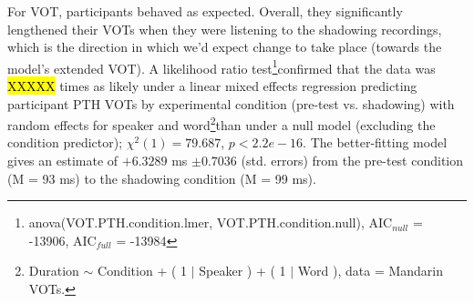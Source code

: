 For VOT, participants behaved as expected. Overall, they significantly lengthened their VOTs when they were listening to the shadowing recordings, %
which is the direction in which we'd expect change to take place (towards the model's extended VOT). A likelihood ratio test\footnote{anova(VOT.PTH.condition.lmer, VOT.PTH.condition.null), AIC$_{null}$ = -13906, AIC$_{full}$ = -13984}confirmed that the data was \hl{XXXXX} times as likely under a linear mixed effects regression predicting participant PTH VOTs by experimental condition (pre-test vs. shadowing) with random effects for speaker and word\footnote{Duration $\sim$ Condition + ( 1 $|$ Speaker ) + ( 1 $|$ Word ), data = Mandarin VOTs.}than under a null model (excluding the condition predictor); $\chi^2 (1) = 79.687$, $p < 2.2e-16$. The better-fitting model gives an estimate of $+6.3289$ ms $\pm 0.7036$ (std. errors) from the pre-test condition (M = 93 ms) to the shadowing condition (M = 99 ms). 

